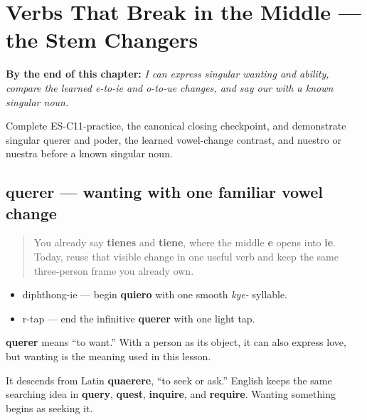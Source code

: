 
\chapter{Verbs That Break in the Middle --- the Stem Changers}
\label{ch:stem-changes}

\begin{chapteropening}
\textbf{By the end of this chapter:} \emph{I can express singular wanting and ability, compare the learned e-to-ie and o-to-ue changes, and say our with a known singular noun.}

Complete ES-C11-practice, the canonical closing checkpoint, and demonstrate singular querer and poder, the learned vowel-change contrast, and nuestro or nuestra before a known singular noun.
\end{chapteropening}

\section[querer]{querer — wanting with one familiar vowel change}

\label{lesson:ES-C11-querer}



\begin{quote}
You already say \textbf{tienes} and \textbf{tiene}, where the middle \textbf{e} opens into \textbf{ie}. Today, reuse that visible change in one useful verb and keep the same three-person frame you already own.
\end{quote}

\begin{sounds}
\begin{itemize}
\raggedright
  \item diphthong-ie — begin \textbf{quiero} with one smooth \emph{kye-} syllable.
  \item r-tap — end the infinitive \textbf{querer} with one light tap.
\end{itemize}
\end{sounds}

\begin{cousinweb}
\textbf{querer} means “to want.” With a person as its object, it can also express love, but wanting is the meaning used in this lesson.

It descends from Latin \textbf{quaerere}, “to seek or ask.” English keeps the same searching idea in \textbf{query}, \textbf{quest}, \textbf{inquire}, and \textbf{require}. Wanting something begins as seeking it.
\end{cousinweb}

